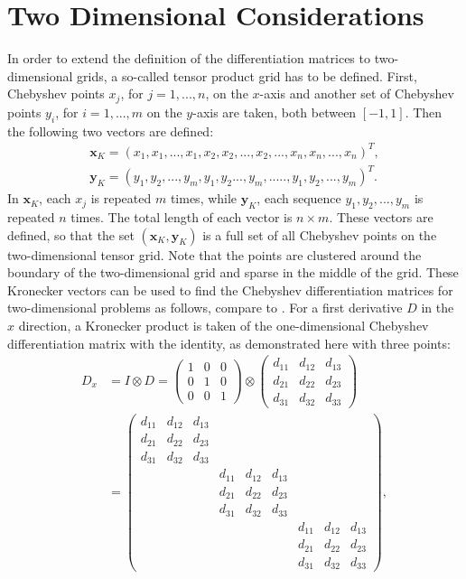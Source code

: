 \documentclass[11pt, a4paper]{article}
\theoremstyle{definition}
\begin{document}
\section{Two Dimensional Considerations}
In order to extend the definition of the differentiation matrices to two-dimensional grids, a so-called tensor product grid has to be defined. First, Chebyshev points $x_j$, for $j=1,...,n$, on the $x$-axis and another set of Chebyshev points $y_i$, for $i=1,...,m$ on the $y$-axis are taken, both between $[-1,1]$. Then the following two vectors are defined:
\begin{align*}
	\mathbf{x}_{K}=(x_1,x_1,...,x_1,x_2,x_2,...,x_2,...,x_n,x_n,...,x_n)^T,\\
	\mathbf{y}_{K}=(y_1,y_2,...,y_m,y_1,y_2...,y_m,.....,y_1,y_2,...,y_m)^T.
\end{align*} 
In $\mathbf{x}_K$, each $x_j$ is repeated $m$ times, while $\mathbf{y}_K$, each sequence $y_1,y_2,...,y_m$ is repeated $n$ times. The total length of each vector is $n \times m$. 
These vectors are defined, so that the set $(\mathbf{x}_K,\mathbf{y}_K)$ is a full set of all Chebyshev points on the two-dimensional tensor grid.
Note that the points are clustered around the boundary of the two-dimensional grid and sparse in the middle of the grid.
These Kronecker vectors can be used to find the Chebyshev differentiation matrices for two-dimensional problems as follows, compare to \cite{bibTrefethen}. For a first derivative $D$ in the $x$ direction, a Kronecker product is taken of the one-dimensional Chebyshev differentiation matrix with the identity, as demonstrated here with three points:
\begin{align*}
	D_x&=I \otimes D = 
	\begin{pmatrix}
		1 & 0 & 0\\
		0 & 1 & 0 \\
		0 & 0 & 1
	\end{pmatrix}
	\otimes
	\begin{pmatrix}
		d_{11} & d_{12} & d_{13}\\
		d_{21} & d_{22} & d_{23} \\
		d_{31} & d_{32} & d_{33}
	\end{pmatrix}
	\\&=
	\begin{pmatrix}
		d_{11} & d_{12} & d_{13} & & &  & & &\\
		d_{21} & d_{22} & d_{23} & & & & & & \\
		d_{31} & d_{32} & d_{33} & & & & & & \\
		& & &d_{11} & d_{12} & d_{13} & & &\\
		& & &d_{21} & d_{22} & d_{23}  & & &\\
		& & &d_{31} & d_{32} & d_{33} & & &\\
		& & & & & &d_{11} & d_{12} & d_{13}\\
		& & & & & &d_{21} & d_{22} & d_{23}  \\
		& & & & & &d_{31} & d_{32} & d_{33} 
	\end{pmatrix},
\end{align*}
\end{document}
